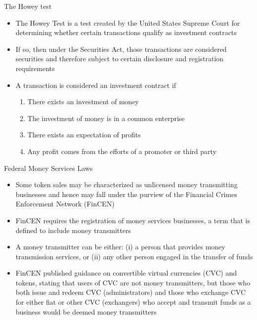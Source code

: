 \documentclass[11pt]{beamer}
\begin{document}

\begin{frame}{The Howey test}
	\begin{itemize}
		\item The Howey Test is a test created by the United States Supreme Court for determining whether certain transactions qualify as investment contracts
		\item If so, then under the Securities Act, those transactions are considered securities and therefore subject to certain disclosure and registration requirements
		\item A transaction is considered an investment contract if
		\begin{enumerate}
			\item There exists an investment of money
			\item The investment of money is in a common enterprise
			\item There exists an expectation of profits
			\item Any profit comes from the efforts of a promoter or third party
		\end{enumerate}
	\end{itemize}
\end{frame}



\begin{frame}{Federal Money Services Laws}
	\begin{itemize}
		\item Some token sales may be characterized as unlicensed money transmitting businesses and hence may fall under the purview of the Financial Crimes Enforcement Network (FinCEN)
		\item FinCEN requires the registration of money services businesses, a term that is defined to include money transmitters
		\item A money transmitter can be either: (i) a person that provides money transmission services, or (ii) any other person engaged in the transfer of funds
		\item FinCEN published guidance on convertible virtual currencies (CVC) and tokens, stating that users of CVC are not money transmitters, but those who both issue and redeem CVC (administrators) and those who exchange CVC for either fiat or other CVC (exchangers) who accept and transmit funds as a business would be deemed money transmitters
	\end{itemize}
\end{frame}
\end{document}
